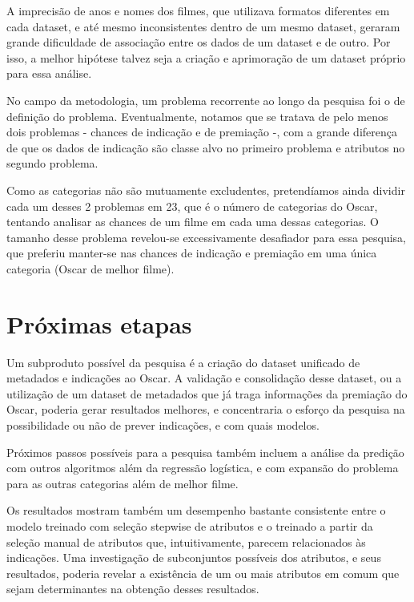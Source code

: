         A imprecisão de anos e nomes dos filmes, que utilizava formatos diferentes em cada dataset, e até mesmo inconsistentes dentro de um mesmo dataset, geraram grande dificuldade de associação entre os dados de um dataset e de outro. Por isso, a melhor hipótese talvez seja a criação e aprimoração de um dataset próprio para essa análise.
        
        No campo da metodologia, um problema recorrente ao longo da pesquisa foi o de definição do problema. Eventualmente, notamos que se tratava de pelo menos dois problemas - chances de indicação e de premiação -, com a grande diferença de que os dados de indicação são classe alvo no primeiro problema e atributos no segundo problema.
        
        Como as categorias não são mutuamente excludentes, pretendíamos ainda dividir cada um desses 2 problemas em 23, que é o número de categorias do Oscar, tentando analisar as chances de um filme em cada uma dessas categorias. O tamanho desse problema revelou-se excessivamente desafiador para essa pesquisa, que preferiu manter-se nas chances de indicação e premiação em uma única categoria (Oscar de melhor filme).
    
    \section[Próximas etapas da pesquisa]{Próximas etapas}
        Um subproduto possível da pesquisa é a criação do dataset unificado de metadados e indicações ao Oscar. A validação e consolidação desse dataset, ou a utilização de um dataset de metadados que já traga informações da premiação do Oscar, poderia gerar resultados melhores, e concentraria o esforço da pesquisa na possibilidade ou não de prever indicações, e com quais modelos.
        
        Próximos passos possíveis para a pesquisa também incluem a análise da predição com outros algoritmos além da regressão logística, e com expansão do problema para as outras categorias além de melhor filme.
        
        Os resultados mostram também um desempenho bastante consistente entre o modelo treinado com seleção stepwise de atributos e o treinado a partir da seleção manual de atributos que, intuitivamente, parecem relacionados às indicações. Uma investigação de subconjuntos possíveis dos atributos, e seus resultados, poderia revelar a existência de um ou mais atributos em comum que sejam determinantes na obtenção desses resultados.
